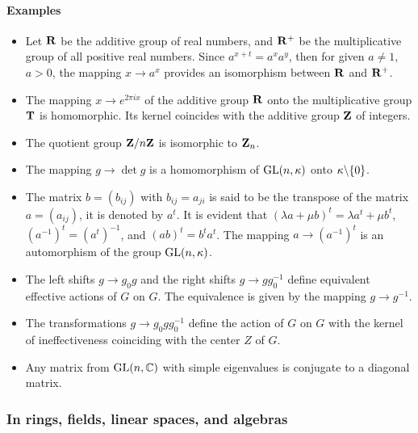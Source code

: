 \paragraph{Examples}
\begin{itemize}
	\item Let $\mathbf{R}$ be the additive group of real numbers, and $\mathbf{R}^+$ be the multiplicative group of all positive real numbers. Since $a^{x+t}=a^xa^y$, then for given $a \ne 1$, $a>0$, the mapping $x\rightarrow a^x$ provides an isomorphism between $\mathbf{R}$ and $\mathbf{R}^+$.
	\item The mapping $x\rightarrow e^{2\pi ix}$ of the additive group $\mathbf{R}$ onto the multiplicative group $\mathbf{T}$ is homomorphic. Its kernel coincides with the additive group $\mathbf{Z}$ of integers.
	\item The quotient group $\mathbf{Z}/n\mathbf{Z}$ is isomorphic to $\mathbf{Z}_n$.
	\item The mapping $g\rightarrow\det g$ is a homomorphism of $\mathrm{GL}(n,\kappa)$ onto $\kappa\backslash\{0\}$.
	\item The matrix $b = (b_{ij})$ with $b_{ij}=a_{ji}$
	is said to be the transpose of the
	matrix $a = (a_{ij})$, it is denoted by $a^t$. It is evident that $(\lambda a+\mu b)^t=\lambda a ^t+\mu b^t$, $(a^{-1})^t=(a^t)^{-1}$, and $(ab)^t=b^ta^t$. The mapping $a\rightarrow (a^{-1})^t$ is an automorphism of the group $\mathrm{GL}(n,\kappa)$.
	\item The left shifts $g\rightarrow g_0g$ and the right shifts $g\rightarrow g g_0^{-1}$ define equivalent
	effective actions of $G$ on $G$. The equivalence is given by the mapping $g\rightarrow g^{-1}$.
	\item The transformations $g\rightarrow g_0gg_0^{-1}$ define the action of $G$ on $G$ with the kernel of
	ineffectiveness coinciding with the center $Z$ of $G$.
	\item Any matrix from $\mathrm{GL}(n, \mathbb{C})$ with simple eigenvalues is conjugate to a diagonal matrix.
\end{itemize}
\subsubsection{In rings, fields, linear spaces, and algebras}

